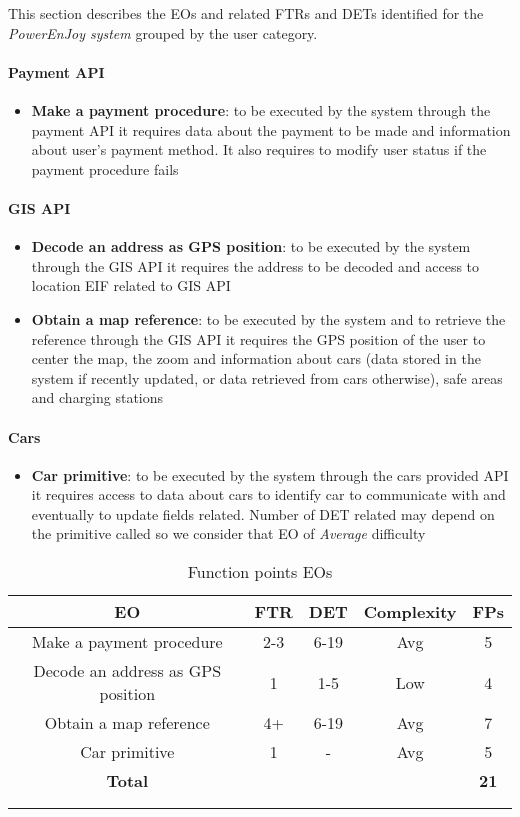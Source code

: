 This section describes the EOs and related FTRs and DETs identified for the \emph{PowerEnJoy system} grouped by the user category.

\paragraph{Payment API}
\begin{itemize}
	\item \textbf{Make a payment procedure}: to be executed by the system through the payment API it requires data about the payment to be made and information about user's payment method. It also requires to modify user status if the payment procedure fails 
\end{itemize}

\paragraph{GIS API}
\begin{itemize}
	\item \textbf{Decode an address as GPS position}: to be executed by the system through the GIS API it requires the address to be decoded and access to location EIF related to GIS API
	\item \textbf{Obtain a map reference}: to be executed by the system and to retrieve the reference through the GIS API it requires the GPS position of the user to center the map, the zoom and information about cars (data stored in the system if recently updated, or data retrieved from cars otherwise), safe areas and charging stations
\end{itemize}

\paragraph{Cars}
\begin{itemize}
	\item \textbf{Car primitive}: to be executed by the system through the cars provided API it requires access to data about cars to identify car to communicate with and eventually to update fields related. Number of DET related may depend on the primitive called so we consider that EO of \emph{Average} difficulty
\end{itemize}

\clearpage 

\begin{longtable}{ccccc}
\toprule
\textbf{EO}	& FTR & DET & 	Complexity  & \textbf{FPs}\\
\midrule
Make a payment procedure & 2-3 & 6-19 & Avg & 5\\
Decode an address as GPS position & 1 & 1-5 & Low & 4 \\
Obtain a map reference & 4+ & 6-19 & Avg & 7\\
Car primitive & 1 & - & Avg & 5  \\
\midrule
\textbf{Total} & & & &  \textbf{21}\\
\bottomrule \\
\caption{Function points EOs}
\label{tbl:eoFP}
\end{longtable}


